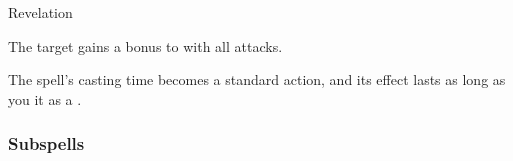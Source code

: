 \newpage
\begin{spellsection}{Revelation}

\begin{spellheader}
\end{spellheader}

\begin{spellcontent}

\begin{spelltargetinginfo}



\end{spelltargetinginfo}


\begin{spelleffects}



\spelleffect
The target gains a  bonus to  with all attacks.








\end{spelleffects}

\end{spellcontent}
\begin{spellfooter}


\end{spellfooter}
\begin{spellsubcontent}


\begin{spellcantrip}
The spell's casting time becomes a standard action, and its effect lasts as long as you  it as a .
\end{spellcantrip}


\end{spellsubcontent}
\end{spellsection}


\subsubsection{Subspells}





